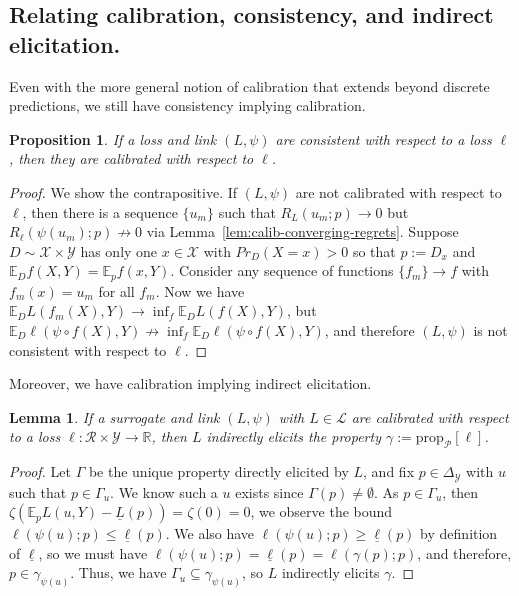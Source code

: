 \documentclass[11pt]{article} %
\newcommand{\reals}{\mathbb{R}}
\newcommand{\simplex}{\Delta_\Y}
\newcommand{\prop}[2][\mathcal{P}]{\mathrm{prop}_{#1}[#2]}
\newcommand{\E}{\mathbb{E}}
\renewcommand{\L}{\mathcal{L}}
\newcommand{\R}{\mathcal{R}}
\newcommand{\X}{\mathcal{X}}
\newcommand{\Y}{\mathcal{Y}}
\newcommand{\exploss}[3]{\E_{#3} #1(#2,Y)}
\newcommand{\risk}[1]{\underline{#1}}
\newtheorem{lemma}{Lemma}
\newtheorem{proposition}{Proposition}
\begin{document}
\subsection{Relating calibration, consistency, and indirect elicitation.}
Even with the more general notion of calibration that extends beyond discrete predictions, we still have consistency implying calibration.
\begin{proposition}\label{prop:consistent-implies-calibrated}
	If a loss and link $(L, \psi)$ are consistent with respect to a loss $\ell$, then they are calibrated with respect to $\ell$.
\end{proposition}
\begin{proof}
	We show the contrapositive.
	If $(L, \psi)$ are not calibrated with respect to $\ell$, then there is a sequence $\{u_m\}$ such that $R_L(u_m; p) \to 0$ but $R_\ell(\psi(u_m); p) \not \to 0$ via Lemma~\ref{lem:calib-converging-regrets}.
	Suppose $D \sim \X \times\Y$ has only one $x \in \X$ with $Pr_D(X = x) > 0$ so that $p := D_x$ and $\E_D f(X,Y) = \E_p f(x, Y)$.
	Consider any sequence of functions $\{f_m\} \to f$ with $f_m(x) = u_m$ for all $f_m$.
	Now we have $\E_D L(f_m(X), Y) \to \inf_f \E_D L(f(X), Y)$, but $\E_D \ell(\psi \circ f(X), Y) \not \to \inf_f \E_D \ell(\psi \circ f(X), Y)$, and therefore $(L, \psi)$ is not consistent with respect to $\ell$.
\end{proof}

Moreover, we have calibration implying indirect elicitation.
\begin{lemma}\label{lem:calib-implies-indir}
	If a surrogate and link $(L, \psi)$ with $L \in \L$ are calibrated with respect to a loss $\ell:\R \times\Y \to \reals$, then $L$ indirectly elicits the property $\gamma := \prop{\ell}$.
\end{lemma}
\begin{proof}
	Let $\Gamma$ be the unique property directly elicited by $L$, and fix $p \in \simplex$ with $u$ such that $p \in \Gamma_u$.
	We know such a $u$ exists since $\Gamma(p) \neq \emptyset$.
	As $p \in \Gamma_u$, then $\zeta(\exploss{L}{u}{p} - \risk{L}(p)) = \zeta(0) = 0$, we observe the bound $\ell(\psi(u); p) \leq \risk{\ell}(p)$.
	We also have $\ell(\psi(u); p) \geq \risk{\ell}(p)$ by definition of $\risk{\ell}$, so we must have $\ell(\psi(u);p) = \risk{\ell}(p) = \ell(\gamma(p); p)$, and therefore, $p \in \gamma_{\psi(u)}$.
	Thus, we have $\Gamma_u \subseteq \gamma_{\psi(u)}$, so $L$ indirectly elicits $\gamma$.
\end{proof}
\end{document}
